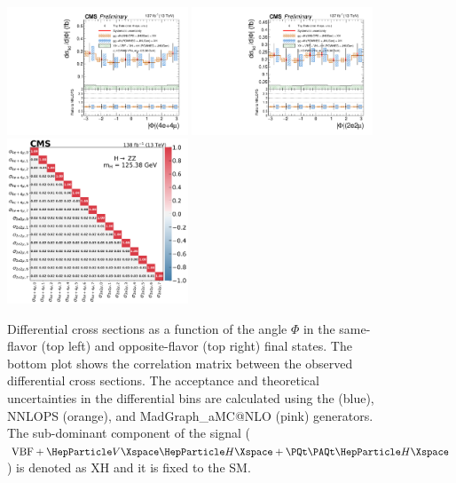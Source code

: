\clearpage

\begin{center}
	\begin{figure}[!htb]
		\centering
		\includegraphics[width=0.48\textwidth]{Images/H4L/angles/model_v4/phi_unfoldwith_4l_SM_125_asimov.pdf}
		\includegraphics[width=0.48\textwidth]{Images/H4L/angles/model_v4/phi_unfoldwith_2e2mu_SM_125_asimov.pdf}\\
		\includegraphics[width=0.48\textwidth]{Images/H4L/correlations/corr_phi_v4.pdf} \\
		\caption{
			Differential cross sections as a function of the angle $\Phi$ in the same-flavor (top left) and opposite-flavor (top right)  final states.
			The bottom plot shows the correlation matrix between the observed differential cross sections.
			The acceptance and theoretical uncertainties in the differential bins are calculated using the \POWHEG (blue), NNLOPS (orange), and MadGraph\_aMC@NLO (pink) generators.
			The sub-dominant component of the signal ($\VBF + \VH + \ttH$) is denoted as XH and it is fixed to the SM.
			\label{fig:fidPHI}}
	\end{figure}
\end{center}

